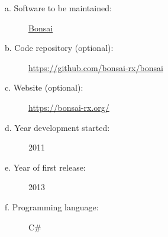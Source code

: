 
\begin{description}

    \item[a. Software to be maintained:] \href{https://bonsai-rx.org/}{Bonsai}

    \item[b. Code repository (optional):] \url{https://github.com/bonsai-rx/bonsai}

    \item[c. Website (optional):] \url{https://bonsai-rx.org/}

    \item[d. Year development started:] 2011

    \item[e. Year of first release:] 2013

    \item[f. Programming language:] C\#

\end{description}

